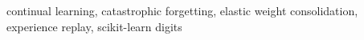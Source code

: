 continual learning, catastrophic forgetting, elastic weight consolidation, experience replay, scikit-learn digits

